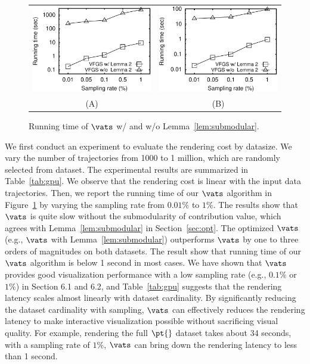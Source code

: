 \begin{figure}
 \centering
 \small
 \begin{tabular}{cc}
   \includegraphics[width=0.44\columnwidth]{pictures/tporto}
   &
   \includegraphics[width=0.44\columnwidth]{pictures/tshenzhen}
   \\
   (A) \pt{}
   &
   (B) \sz{}	
 \end{tabular}
 \vspace{-3mm}
 \caption{Running time of $\vats$ w/ and w/o Lemma~\ref{lem:submodular}.}
 \label{fig:cost}
 \vspace{-3mm}
\end{figure}


We first conduct an experiment to evaluate the rendering cost by datasize. We vary the number of trajectories from 1000 to 1 million, which are randomly selected from \pt{} dataset. The experimental results are summarized in Table~\ref{tab:gpu}. We observe that the rendering cost is linear with the input data trajectories.
Then, we report the running time of our $\vats$ algorithm in Figure~\ref{fig:cost} by varying the sampling rate from $0.01\%$ to $1\%$. The results show that $\vats$ is quite slow without the submodularity of contribution value, which agrees with Lemma~\ref{lem:submodular} in Section~\ref{sec:opt}.
The optimized $\vats$ (e.g., $\vats$ with Lemma~\ref{lem:submodular}) outperforms $\vats$ by one to three orders of magnitudes on both datasets. The result show that running time of our $\vats$ algorithm is below 1 second in most cases. We have shown that $\vats$ provides good visualization performance with a low sampling rate (e.g., $0.1\%$ or $1\%$) in Section 6.1 and 6.2,  and Table~\ref{tab:gpu} suggests that the rendering latency scales almost linearly with dataset cardinality. By significantly reducing the dataset cardinality with sampling, $\vats$ can effectively reduces the rendering latency to make interactive visualization possible without sacrificing visual quality. For example, rendering the full $\pt{}$ dataset takes about 34 seconds, with a sampling rate of $1\%$, $\vats$ can bring down the rendering latency to less than 1 second.

